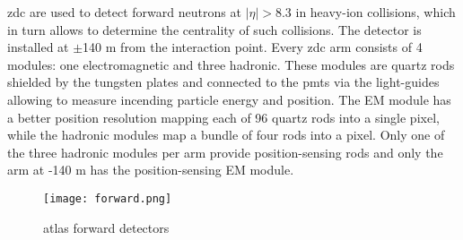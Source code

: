 	 \gls{zdc} are used to detect forward neutrons at $|\eta| > 8.3$ in heavy-ion collisions, which in turn allows to determine the centrality of such collisions.  The detector is installed at $\pm$140 m from the interaction point. Every \gls{zdc} arm consists of 4 modules: one electromagnetic and three hadronic. These modules are quartz rods shielded by the tungsten plates and connected to the \glspl{pmt} via the light-guides allowing to measure incending particle energy and position. The EM module has a better position resolution mapping each of 96 quartz rods into a single pixel, while the hadronic modules map a bundle of four rods into a pixel. Only one of the three hadronic modules per arm provide position-sensing rods and only the arm at -140 m has the position-sensing EM module.  
    \begin{figure}[htpb]
	\texttt{[image: forward.png]}
	\caption{ \gls{atlas} forward detectors}
	\label{fig::forward}
\end{figure}

